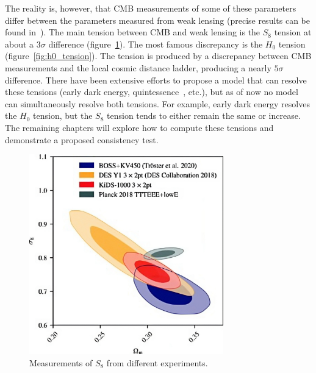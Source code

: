 The reality is, however, that CMB measurements of some of these parameters differ between the parameters measured from weak lensing (precise results can be found in~\cite{amon_dark_2022,noauthor_planck_2018,planck_collaboration_planck_2020}). The main tension between CMB and weak lensing is the $S_8$ tension at about a $3\sigma$ difference (figure~\ref{fig:s8_tension}). The most famous discrepancy is the $H_0$ tension (figure~\ref{fig:h0_tension}). The tension is produced by a discrepancy between CMB measurements and the local cosmic distance ladder, producing a nearly $5\sigma$ difference.  There have been extensive efforts to propose a model that can resolve these tensions (early dark energy\cite{kamionkowski_hubble_2022}, quintessence~\cite{tsujikawa_quintessence_2013}, etc.), but as of now no model can simultaneously resolve both tensions. For example, early dark energy resolves the $H_0$ tension, but the $S_8$ tension tends to either remain the same or increase. The remaining chapters will explore how to compute these tensions and demonstrate a proposed consistency test.
\begin{figure}[ht]
	\centering
	\includegraphics[width=0.75\textwidth]{plots/s8_tension_4x.jpeg}
	\caption{Measurements of $S_8$ from different experiments.}
	\label{fig:s8_tension}
\end{figure}
